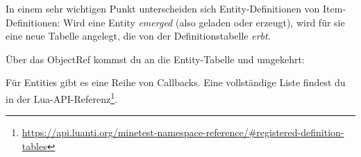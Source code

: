 In einem sehr wichtigen Punkt unterscheiden sich Entity-Definitionen von
Item-Definitionen: Wird eine Entity \emph{emerged} (also geladen oder
erzeugt), wird für sie eine neue Tabelle angelegt, die von der
Definitionstabelle \emph{erbt}.

Über das ObjectRef kommst du an die
Entity-Tabelle und umgekehrt:

\begin{Shaded}
\begin{Highlighting}[]
  \OperatorTok{=} \OperatorTok{:}\OperatorTok{()}
  \OperatorTok{=} 
\OperatorTok{(}
         \OperatorTok{(}\OperatorTok{:}\OperatorTok{())}
\OperatorTok{)}
\end{Highlighting}
\end{Shaded}

Für Entities gibt es eine Reihe von Callbacks.
Eine vollständige Liste findest du in der Lua-API-Referenz\footnote{\url{https://api.luanti.org/minetest-namespace-reference/\#registered-definition-tables}}.

